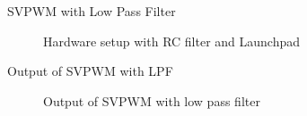 \begin{frame}{SVPWM with Low Pass Filter}
	\begin{figure}
		\centering


		\caption{Hardware setup with RC filter and Launchpad}
	\end{figure}
\end{frame}

\begin{frame}{Output of SVPWM with LPF}
	\begin{figure}
		\centering


		\caption{Output of SVPWM with low pass filter}
	\end{figure}
\end{frame}


